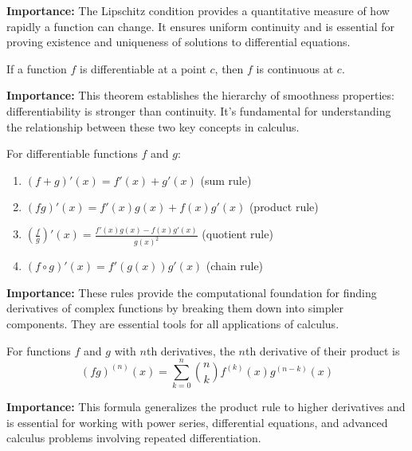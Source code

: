 \noindent\textbf{Importance:} The Lipschitz condition provides a quantitative measure of how rapidly a function can change. It ensures uniform continuity and is essential for proving existence and uniqueness of solutions to differential equations.



\begin{theorem}
If a function $f$ is differentiable at a point $c$, then $f$ is continuous at $c$.
\end{theorem}

\noindent\textbf{Importance:} This theorem establishes the hierarchy of smoothness properties: differentiability is stronger than continuity. It's fundamental for understanding the relationship between these two key concepts in calculus.



\begin{theorem}
For differentiable functions $f$ and $g$:
\begin{enumerate}
\item $(f + g)'(x) = f'(x) + g'(x)$ (sum rule)
\item $(fg)'(x) = f'(x)g(x) + f(x)g'(x)$ (product rule)
\item $\left(\frac{f}{g}\right)'(x) = \frac{f'(x)g(x) - f(x)g'(x)}{g(x)^2}$ (quotient rule)
\item $(f \circ g)'(x) = f'(g(x))g'(x)$ (chain rule)
\end{enumerate}
\end{theorem}

\noindent\textbf{Importance:} These rules provide the computational foundation for finding derivatives of complex functions by breaking them down into simpler components. They are essential tools for all applications of calculus.



\begin{theorem}
For functions $f$ and $g$ with $n$th derivatives, the $n$th derivative of their product is
\[ (fg)^{(n)}(x) = \sum_{k=0}^{n} \binom{n}{k} f^{(k)}(x)g^{(n-k)}(x) \]
\end{theorem}

\noindent\textbf{Importance:} This formula generalizes the product rule to higher derivatives and is essential for working with power series, differential equations, and advanced calculus problems involving repeated differentiation.



